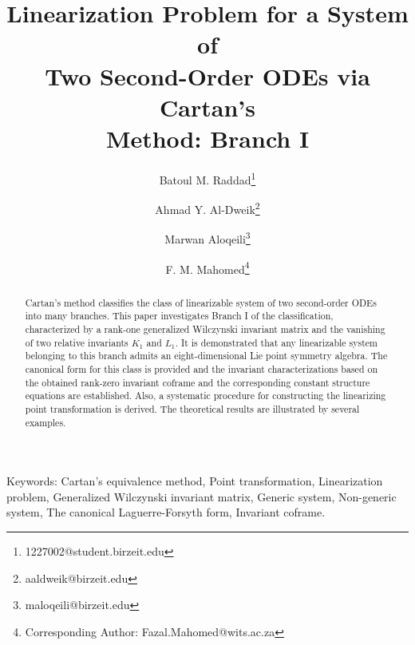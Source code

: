 \documentclass[12pt]{article}
\begin{document}
\title{\Large\bfseries Linearization Problem for a System of \\Two Second-Order ODEs via Cartan's \\Method: Branch I}
\author[1]{Batoul M. Raddad\thanks{1227002@student.birzeit.edu}}
\author[1]{Ahmad Y. Al-Dweik\thanks{aaldweik@birzeit.edu}}
\author[1]{Marwan Aloqeili\thanks{maloqeili@birzeit.edu}}
\author[2]{F. M. Mahomed\thanks{Corresponding Author: Fazal.Mahomed@wits.ac.za}}
\maketitle
\begin{abstract}
Cartan's method classifies the class of linearizable system of two second-order ODEs into many branches. This paper investigates Branch I of the classification, characterized by a rank-one generalized Wilczynski  invariant matrix and the vanishing of two relative invariants $K_1$ and $L_1$. It is demonstrated that any linearizable system belonging to this branch admits an eight-dimensional Lie point symmetry algebra. The canonical form for this class is provided and the invariant characterizations based on the obtained rank-zero invariant coframe and the corresponding constant structure equations are established. Also, a systematic procedure for constructing the linearizing point transformation is derived. The theoretical results are illustrated by several examples.	
\end{abstract}
\bigskip
Keywords:   Cartan's equivalence method, Point transformation, Linearization problem, Generalized Wilczynski  invariant matrix, Generic system, Non-generic system, The canonical Laguerre-Forsyth form, Invariant coframe.
\end{document}
